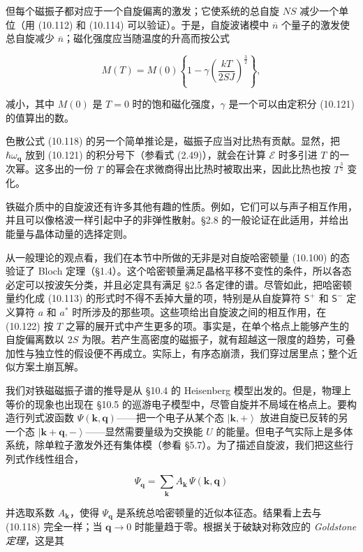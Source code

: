 但每个磁振子都对应于一个自旋偏离的激发；它使系统的总自旋 $NS$ 减少一个单位（用 (10.112) 和 (10.114) 可以验证）。于是，自旋波诸模中 $\overline{n}$ 个量子的激发使总自旋减少 $\overline{n}$；磁化强度应当随温度的升高而按公式

\begin{equation*}
M(T) = M(0)\left\{1-\gamma\left(\frac{kT}{2SJ}\right)^{\frac{3}{2}}\right\},
\tag{10.122}
\end{equation*}

减小，其中 $M(0)$ 是 $T=0$ 时的饱和磁化强度，$\gamma$ 是一个可以由定积分 (10.121) 的值算出的数。

色散公式 (10.118) 的另一个简单推论是，磁振子应当对比热有贡献。显然，把 $\hbar\omega_{\mathbf{q}}$ 放到 (10.121) 的积分号下（参看式 (2.49)），就会在计算 $\mathcal{E}$ 时多引进 $T$ 的一次幂。这多出的一份 $T$ 的幂会在求微商得出比热时被取出来，因此比热也按 $T^{\frac{3}{2}}$ 变化。

铁磁介质中的自旋波还有许多其他有趣的性质。例如，它们可以与声子相互作用，并且可以像格波一样引起中子的非弹性散射。§2.8 的一般论证在此适用，并给出能量与晶体动量的选择定则。

从一般理论的观点看，我们在本节中所做的无非是对自旋哈密顿量 (10.100) 的态验证了 Bloch 定理（§1.4）。这个哈密顿量满足晶格平移不变性的条件，所以各态必定可以按波矢分类，并且必定具有满足 §2.5 各定律的谱。尽管如此，把哈密顿量约化成 (10.113) 的形式时不得不丢掉大量的项，特别是从自旋算符 $\mathsf{S}^{+}$ 和 $\mathsf{S}^{-}$ 定义算符 $a$ 和 $a^{*}$ 时所涉及的那些项。这些项给出自旋波之间的相互作用，在 (10.122) 按 $T$ 之幂的展开式中产生更多的项。事实是，在单个格点上能够产生的自旋偏离数以 $2S$ 为限。若产生高密度的磁振子，就有超越这一限度的趋势，可叠加性与独立性的假设便不再成立。实际上，有序态崩溃，我们穿过居里点；整个近似方案土崩瓦解。

我们对铁磁磁振子谱的推导是从 §10.4 的 Heisenberg 模型出发的。但是，物理上等价的现象也出现在 §10.5 的巡游电子模型中，尽管自旋并不局域在格点上。要构造行列式波函数 $\Psi(\mathbf{k},\mathbf{q})$——把一个电子从某个态 $\left|\mathbf{k},+\right\rangle$ 放进自旋已反转的另一个态 $\left|\mathbf{k}+\mathbf{q},-\right\rangle$——显然需要量级为交换能 $U$ 的能量。但电子气实际上是多体系统，除单粒子激发外还有集体模（参看 §5.7）。为了描述自旋波，我们把这些行列式作线性组合，

\begin{equation*}
\Psi_{\mathbf{q}} = \sum_{\mathbf{k}} A_{\mathbf{k}}\,\Psi(\mathbf{k},\mathbf{q})
\tag{10.123}
\end{equation*}

并选取系数 $A_{\mathbf{k}}$，使得 $\Psi_{\mathbf{q}}$ 是系统总哈密顿量的近似本征态。结果看上去与 (10.118) 完全一样；当 $\mathbf{q}\to 0$ 时能量趋于零。根据关于破缺对称效应的 \emph{Goldstone 定理}，这是其
